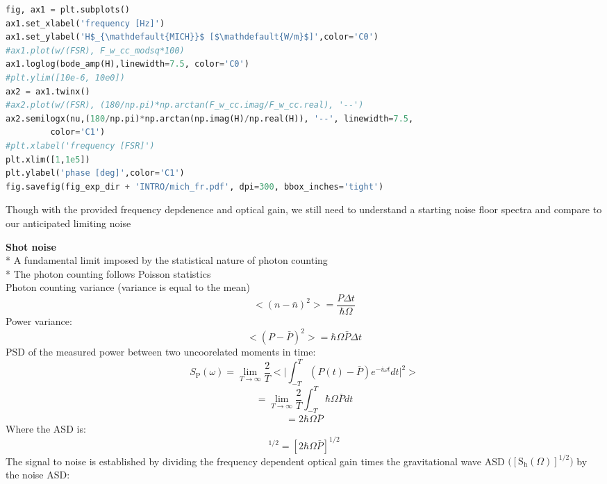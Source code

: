 \begin{spacing}{1.2} \begin{lstlisting}[frame=single, language=Python]
fig, ax1 = plt.subplots()
ax1.set_xlabel('frequency [Hz]')
ax1.set_ylabel('H$_{\mathdefault{MICH}}$ [$\mathdefault{W/m}$]',color='C0')
#ax1.plot(w/(FSR), F_w_cc_modsq*100)
ax1.loglog(bode_amp(H),linewidth=7.5, color='C0')
#plt.ylim([10e-6, 10e0])
ax2 = ax1.twinx()
#ax2.plot(w/(FSR), (180/np.pi)*np.arctan(F_w_cc.imag/F_w_cc.real), '--')
ax2.semilogx(nu,(180/np.pi)*np.arctan(np.imag(H)/np.real(H)), '--', linewidth=7.5,
	     color='C1')
#plt.xlabel('frequency [FSR]')
plt.xlim([1,1e5])
plt.ylabel('phase [deg]',color='C1')
fig.savefig(fig_exp_dir + 'INTRO/mich_fr.pdf', dpi=300, bbox_inches='tight')
\end{lstlisting} \end{spacing}

Though with the provided frequency depdenence and optical gain, we still
need to understand a starting noise floor spectra and compare to our
anticipated limiting noise 

\noindent\textbf{Shot noise} 
\\
* A fundamental limit imposed by the statistical nature of photon counting 
\\
* The photon counting follows Poisson statistics 
\\
\indent    * Photon counting variance (variance is equal to the
mean) 
\begin{equation} < (n-\bar{n})^2 >  = \frac{P \Delta t}{ \hbar \Omega} \end{equation} 
\indent * Power variance:
\begin{equation} < (P - \bar{P})^2 >  = \hbar \Omega  \bar{P} \Delta t \end{equation} 
\indent * PSD of the measured power between two uncoorelated moments in time:
\begin{equation} S_\mathrm{P} (\omega) = \lim_{T \to \infty} \frac{2}{T} \Big< \big| \int_{-T}^{T} (P(t) - \bar{P}) e^{-i\omega t} dt \big|^2 \Big> \end{equation}
\begin{equation} =  \lim_{T \to \infty} \frac{2}{T} \int_{-T}^{T} \hbar \Omega \bar{P} dt  \end{equation}
\begin{equation} = 2 \hbar \Omega \bar{P} \end{equation} 
\indent * Where the ASD is:
\begin{equation} [S_P (\omega)]^{1/2} = [2 \hbar \Omega \bar{P}]^{1/2}\end{equation}The signal to
noise is established by dividing the frequency dependent optical gain
times the gravitational wave ASD
\(\big( [\mathrm{S}_{\mathrm{h}}(\Omega)]^{1/2} \big)\) by the noise
ASD:

